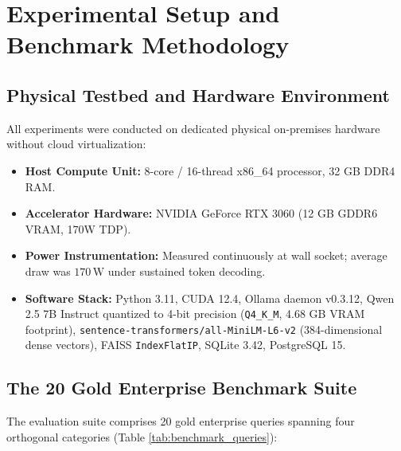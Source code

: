 \documentclass[journal,10pt,twocolumn]{IEEEtran}
\begin{document}
\section{Experimental Setup and Benchmark Methodology}
\label{sec:experimental_setup}

\subsection{Physical Testbed and Hardware Environment}
All experiments were conducted on dedicated physical on-premises hardware without cloud virtualization:
\begin{itemize}
    \item \textbf{Host Compute Unit:} 8-core / 16-thread x86\_64 processor, 32 GB DDR4 RAM.
    \item \textbf{Accelerator Hardware:} NVIDIA GeForce RTX 3060 (12 GB GDDR6 VRAM, 170W TDP).
    \item \textbf{Power Instrumentation:} Measured continuously at wall socket; average draw was $170\,\text{W}$ under sustained token decoding.
    \item \textbf{Software Stack:} Python 3.11, CUDA 12.4, Ollama daemon v0.3.12, Qwen 2.5 7B Instruct quantized to 4-bit precision (\texttt{Q4\_K\_M}, 4.68 GB VRAM footprint), \texttt{sentence-transformers/all-MiniLM-L6-v2} (384-dimensional dense vectors), FAISS \texttt{IndexFlatIP}, SQLite 3.42, PostgreSQL 15.
\end{itemize}

\subsection{The 20 Gold Enterprise Benchmark Suite}
The evaluation suite comprises 20 gold enterprise queries spanning four orthogonal categories (Table \ref{tab:benchmark_queries}):
\end{document}
